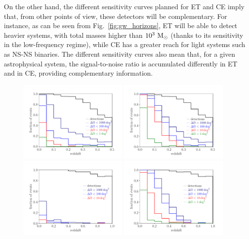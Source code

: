 On the other hand, the different sensitivity curves planned for  ET and CE imply that, from other points of view, these detectors will be complementary. For instance,  as can be seen from  Fig.~\ref{fig:gw_horizons}, ET will be  able to detect heavier systems, with total masses higher than $10^3~\mathrm{M}_{\odot}$ (thanks to its sensitivity in the low-frequency regime), while CE has a greater reach for light systems such as NS-NS binaries. The different sensitivity curves also mean that, for a given astrophysical system, the signal-to-noise ratio is accumulated differently in ET and in CE, providing complementary information.


\begin{figure}[t]
\centering
\includegraphics[width=0.48\textwidth]{Figures/ETBNS.pdf}
\includegraphics[width=0.48\textwidth]{Figures/ETHLIVKBNS.pdf}
\includegraphics[width=0.48\textwidth]{Figures/ETBBH.pdf}
\includegraphics[width=0.48\textwidth]{Figures/ET2GBBH.pdf}

\end{figure}
